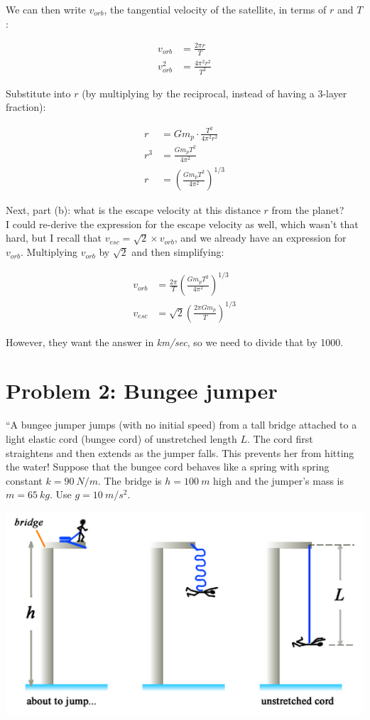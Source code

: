 \documentclass[8.01x]{subfiles}
\begin{document}
We can then write $v_{orb}$, the tangential velocity of the satellite, in terms of $r$ and $T$:

\begin{align}
v_{orb} &= \frac{2 \pi r}{T}\\
v_{orb}^2 &= \frac{4 \pi^2 r^2}{T^2}
\end{align}

Substitute into $r$ (by multiplying by the reciprocal, instead of having a 3-layer fraction):

\begin{align}
r &= G m_p \cdot \frac{T^2}{4 \pi^2 r^2}\\
r^3 &= \frac{G m_p T^2}{4 \pi^2}\\
r &= \left(\frac{G m_p T^2}{4 \pi^2}\right)^{1/3}
\end{align}

Next, part (b): what is the escape velocity at this distance $r$ from the planet?\\
I could re-derive the expression for the escape velocity as well, which wasn't that hard, but I recall that $v_{esc} = \sqrt{2} \times v_{orb}$, and we already have an expression for $v_{orb}$. Multiplying $v_{orb}$ by $\sqrt{2}$ and then simplifying:

\begin{align}
v_{orb} &= \frac{2 \pi}{T} \left(\frac{G m_p T^2}{4 \pi^2}\right)^{1/3}\\
v_{esc} &= \sqrt{2} \left(\frac{2 \pi G m_p}{T}\right)^{1/3}
\end{align}

However, they want the answer in \emph{km/sec}, so we need to divide that by 1000.

\section{Problem 2: Bungee jumper}

``A bungee jumper jumps (with no initial speed) from a tall bridge attached to a light elastic cord (bungee cord) of unstretched length $L$. The cord first straightens and then extends as the jumper falls. This prevents her from hitting the water! Suppose that the bungee cord behaves like a spring with spring constant $k = \SI{90}{N/m}$. The bridge is $h = \SI{100}{m}$ high and the jumper's mass is $m = \SI{65}{kg}$. Use $g = \SI{10}{m/s^2}$.

\begin{center}
\includegraphics[scale=0.6]{Graphics/h5p2}
\end{center}
\end{document}
